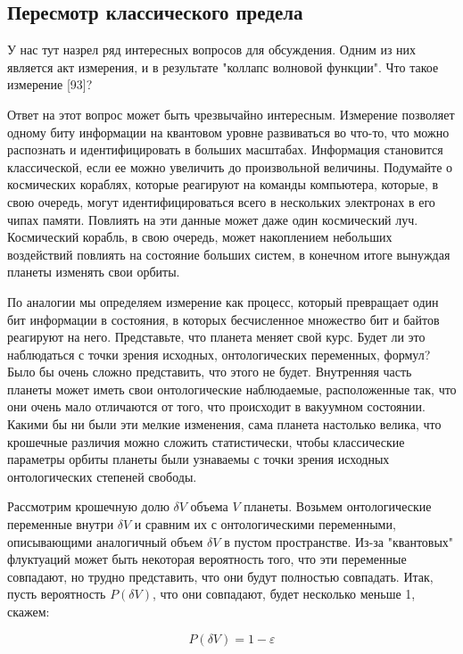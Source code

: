 \documentclass[main.tex]{subfiles}
\begin{document}
\subsection{Пересмотр классического предела}\label{ch4.2}

У нас тут назрел ряд интересных вопросов для обсуждения. Одним из них является акт измерения, и в результате "коллапс волновой функции". Что такое измерение [93]?

Ответ на этот вопрос может быть чрезвычайно интересным. Измерение позволяет одному биту информации на квантовом уровне развиваться во что-то, что можно распознать и идентифицировать в больших масштабах. Информация становится классической, если ее можно увеличить до произвольной величины. Подумайте о космических кораблях, которые реагируют на команды компьютера, которые, в свою очередь, могут идентифицироваться всего в нескольких электронах в его чипах памяти. Повлиять на эти данные может даже один космический луч. Космический корабль, в свою очередь, может накоплением небольших воздействий повлиять на состояние больших систем, в конечном итоге вынуждая планеты изменять свои орбиты.

По аналогии мы определяем измерение как процесс, который превращает один бит информации в состояния, в которых бесчисленное множество бит и байтов реагируют на него. Представьте, что планета меняет свой курс. Будет ли это наблюдаться с точки зрения исходных, онтологических переменных, формул? Было бы очень сложно представить, что этого не будет. Внутренняя часть планеты может иметь свои онтологические наблюдаемые, расположенные так, что они очень мало отличаются от того, что происходит в вакуумном состоянии. Какими бы ни были эти мелкие изменения, сама планета настолько велика, что крошечные различия можно сложить статистически, чтобы классические параметры орбиты планеты были узнаваемы с точки зрения исходных онтологических степеней свободы.

Рассмотрим крошечную долю $\delta V$ объема $V$ планеты. Возьмем онтологические переменные внутри $\delta V$ и сравним их с онтологическими переменными, описывающими аналогичный объем $\delta V$ в пустом пространстве. Из-за "квантовых" флуктуаций может быть некоторая вероятность того, что эти переменные совпадают, но трудно представить, что они будут полностью совпадать. Итак, пусть вероятность $P (\delta V)$, что они совпадают, будет несколько меньше 1, скажем:

\begin{equation}\label{4.1}
	P (\delta V) = 1 - \varepsilon
\end{equation}
          
\end{document}
